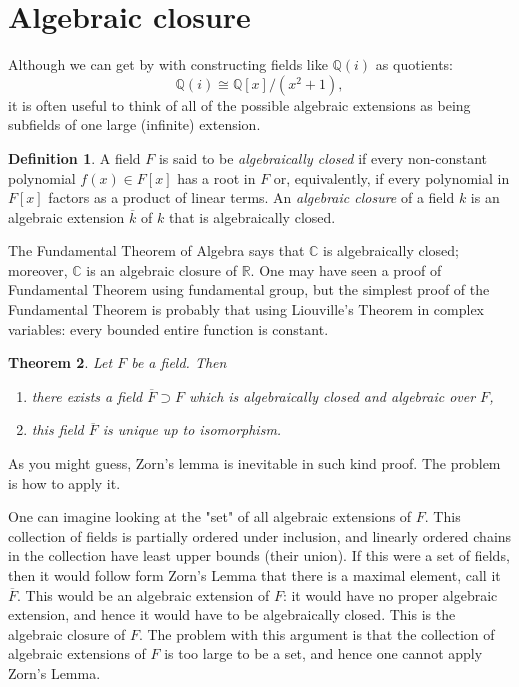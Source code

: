 \documentclass[12pt]{report}
\newtheorem{theorem}{Theorem}[section]
\theoremstyle{definition}
\newtheorem{definition}[theorem]{Definition}
\newcommand{\CC}{\mathbb{C}}
\newcommand{\QQ}{\mathbb{Q}}
\newcommand{\RR}{\mathbb{R}}
\begin{document}
\section{Algebraic closure}

Although we can get by with constructing fields like $\QQ(i)$ as quotients:
$$\QQ(i) \cong \QQ[x]/(x^2 + 1),$$
it is often useful to think of all of the possible algebraic extensions as being subfields of one large (infinite) extension.

\begin{definition}
	A field $F$ is said to be \emph{algebraically closed} if every non-constant polynomial $f(x) \in F[x]$ has a root in $F$ or, equivalently, if every polynomial in $F[x]$ factors as a product of linear terms. An \emph{algebraic closure} of a field $k$ is an algebraic extension $\overline{k}$ of $k$ that is algebraically closed.
\end{definition}

The Fundamental Theorem of Algebra says that $\CC$ is algebraically closed; moreover, $\CC$ is an algebraic closure of $\RR$. One may have seen a proof of Fundamental Theorem using fundamental group, but the simplest proof of the Fundamental Theorem is probably that using Liouville's Theorem in complex variables: every bounded entire function is constant.

\begin{theorem}\label{ac}
	Let $F$ be a field. Then \begin{enumerate}
		\item there exists a field $\overline{F}\supset F$ which is algebraically closed and algebraic over $F$,
		\item this field $\overline{F}$ is unique up to isomorphism.
	\end{enumerate}
\end{theorem}

As you might guess, Zorn's lemma is inevitable in such kind proof. The problem is how to apply it.

One can imagine looking at the "set" of all algebraic extensions of $F$. This collection of fields is partially ordered under inclusion, and linearly ordered chains in the collection have least upper bounds (their union). If this were a set of fields, then it would follow form Zorn's Lemma that there is a maximal element, call it $\overline{F}$. This would be an algebraic extension of $F$: it would have no proper algebraic extension, and hence it would have to be algebraically closed. This is the algebraic closure of $F$. The problem with this argument is that the collection of algebraic extensions of $F$ is too large to be a set, and hence one cannot apply Zorn's Lemma.
\end{document}
